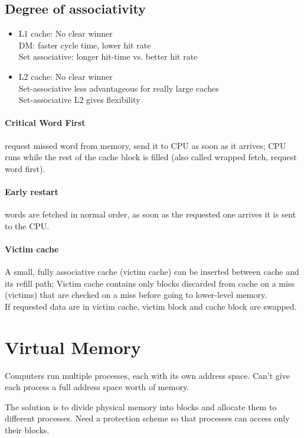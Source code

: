 \subsection{Degree of associativity}
\begin{itemize}
    \item L1 cache: No clear winner\\
    DM: faster cycle time, lower hit rate\\
    Set associative: longer hit-time vs. better hit rate
    \item L2 cache: No clear winner\\
    Set-associative less advantageous for really large caches\\
    Set-associative L2 gives flexibility
\end{itemize}

\paragraph{Critical Word First}
request missed word from memory, send it to CPU as soon as it arrives; CPU runs while the rest of the cache block is filled (also called wrapped  fetch, request word first).

\paragraph{Early restart}
words are fetched in normal order, as soon as the requested one arrives it is sent to the CPU.

\paragraph{Victim cache}
A small, fully associative cache (victim cache) can be inserted between cache and its refill path; Victim cache contains only blocks discarded from cache on a miss (victims) that are checked on a miss before going to lower-level memory.\\
If requested data are in victim cache, victim block and cache block are swapped.

\section{Virtual Memory}
Computers run multiple processes, each with its own address space.
Can’t give each process a full address space worth of memory.

The solution is to divide physical memory into blocks and allocate them to different processes.
Need a protection scheme so that processes can access only their blocks.

